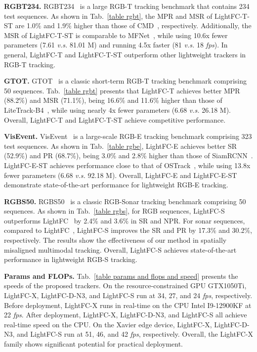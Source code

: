 \textbf{RGBT234.} RGBT234~\cite{rgbt234} is a large RGB-T tracking benchmark that contains 234 test sequences. As shown in Tab.~\ref{table rgbt}, the MPR and MSR of LightFC-T-ST are 1.0\% and 1.9\% higher than those of CMD~\cite{cmd}, respectively. Additionally, the MSR of LightFC-T-ST is comparable to MFNet~\cite{mfnet}, while using 10.6x fewer parameters (7.61 \textit{v.s.} 81.01 M) and running 4.5x faster (81 \textit{v.s. }18 \textit{fps}). In general, LightFC-T and LightFC-T-ST outperform other lightweight trackers in RGB-T tracking.

\textbf{GTOT.} GTOT~\cite{gtot} is a classic short-term RGB-T tracking benchmark comprising 50 sequences. Tab.~\ref{table rgbt} presents that LightFC-T achieves better MPR (88.2\%) and MSR (71.1\%), being  16.6\% and 11.6\% higher than those of LiteTrack-B4~\cite{litetrack}, while using nearly 4x fewer parameters (6.68 \textit{v.s.} 26.18 M). Overall, LightFC-T and LightFC-T-ST achieve competitive performance.







\textbf{VisEvent.} VisEvent~\cite{visevent} is a large-scale RGB-E tracking benchmark comprising 323 test sequences. As shown in Tab.~\ref{table rgbe}, LightFC-E achieves better SR (52.9\%) and PR (68.7\%), being 3.0\% and 2.8\% higher than those of SiamRCNN~\cite{siamrcnn}. LightFC-E-ST achieves performance close to that of OSTrack~\cite{ostrack}, while using 13.8x fewer parameters (6.68 \textit{v.s.} 92.18 M). Overall, LightFC-E and LightFC-E-ST demonstrate state-of-the-art performance for lightweight RGB-E tracking.

\textbf{RGBS50.} RGBS50~\cite{rgbs50} is a classic RGB-Sonar tracking benchmark comprising 50 sequences. As shown in Tab.~\ref{table rgbs}, for RGB sequences, LightFC-S outperforms LightFC~\cite{lightfc} by 2.4\% and 3.6\% in SR and NPR. For sonar sequences, compared to LightFC~\cite{lightfc}, LightFC-S improves the SR and PR by 17.3\% and 30.2\%, respectively. The results show the effectiveness of our method in spatially misaligned multimodal tracking. Overall, LightFC-S achieves state-of-the-art performance in lightweight RGB-S tracking.

\textbf{Params and FLOPs.} Tab.~\ref{table params and flops and speed} presents the speeds of the proposed trackers. On the resource-constrained GPU GTX1050Ti, LightFC-X, LightFC-D-N3, and LightFC-S run at 34, 27, and 24 \textit{fps}, respectively. Before deployment, LightFC-X runs in real-time on the CPU Intel I9-12900KF at 22 \textit{fps}. After deployment, LightFC-X, LightFC-D-N3, and LightFC-S all achieve real-time speed on the CPU. On the Xavier edge device, LightFC-X, LightFC-D-N3, and LightFC-S run at 51, 46, and 42 \textit{fps}, respectively. Overall, the LightFC-X family shows significant potential for practical deployment.

